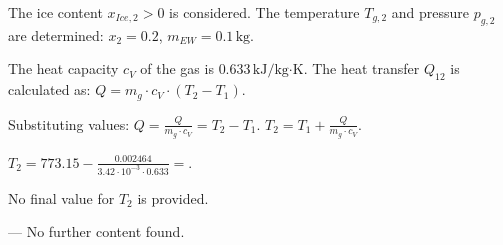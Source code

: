 The ice content \( x_{Ice,2} > 0 \) is considered.  
The temperature \( T_{g,2} \) and pressure \( p_{g,2} \) are determined:  
\( x_2 = 0.2 \), \( m_{EW} = 0.1 \, \text{kg} \).  

The heat capacity \( c_V \) of the gas is \( 0.633 \, \text{kJ/kg·K} \).  
The heat transfer \( Q_{12} \) is calculated as:  
\( Q = m_g \cdot c_V \cdot (T_2 - T_1) \).  

Substituting values:  
\( Q = \frac{Q}{m_g \cdot c_V} = T_2 - T_1 \).  
\( T_2 = T_1 + \frac{Q}{m_g \cdot c_V} \).  

\( T_2 = 773.15 - \frac{0.002464}{3.42 \cdot 10^{-3} \cdot 0.633} = \).  

No final value for \( T_2 \) is provided.  

---  
No further content found.